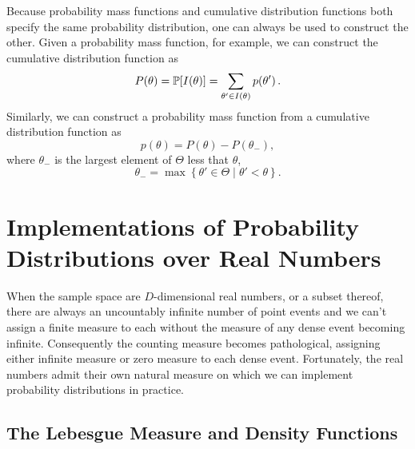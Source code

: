 Because probability mass functions and cumulative distribution functions both
specify the same probability distribution, one can always be used to construct
the other.  Given a probability mass function, for example, we can construct
the cumulative distribution function as
%
\begin{equation*}
P \! \left( \theta \right)
= \mathbb{P} \! \left[ I \! \left( \theta \right) \right]
= \sum_{\theta' \in I ( \theta )} p \! \left( \theta' \right).
\end{equation*}
%
Similarly, we can construct a probability mass function from a cumulative
distribution function as
%
\begin{equation*}
p \! \left( \theta \right) = 
P \! \left( \theta \right)
- P \! \left( \theta_{-} \right),
\end{equation*}
%
where $\theta_{-}$ is the largest element of $\Theta$ less that $\theta$,
%
\begin{equation*}
\theta_{-} = \max \left\{ \theta' \in \Theta \mid \theta' < \theta \right\}.
\end{equation*}

\section{Implementations of Probability Distributions over Real
Numbers}

When the sample space are $D$-dimensional real numbers, or
a subset thereof, there are always an uncountably infinite number 
of point events and we can't assign a finite measure to each without
the measure of any dense event becoming infinite.  Consequently
the counting measure becomes pathological, assigning either infinite 
measure or zero measure to each dense event.  Fortunately, the real 
numbers admit their own natural measure on which we can implement 
probability distributions in practice.

\subsection{The Lebesgue Measure and Density Functions}

